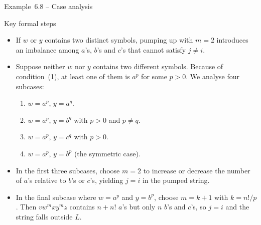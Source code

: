\begin{frame}[t]{Example 6.8 – Case analysis}
  \begin{tblock}{Key formal steps}
    \begin{itemize}
      \item If $w$ or $y$ contains two distinct symbols, pumping up with
        $m=2$ introduces an imbalance among $a$’s, $b$’s and $c$’s that
        cannot satisfy $j \ne i$.
      \item Suppose neither $w$ nor $y$ contains two different symbols.
        Because of condition (1), at least one of them is $a^p$ for
        some $p>0$.  We analyse four subcases:
        \begin{enumerate}
          \item $w=a^p$, $y=a^q$.
          \item $w=a^p$, $y=b^q$ with $p>0$ and $p \ne q$.
          \item $w=a^p$, $y=c^q$ with $p>0$.
          \item $w=a^p$, $y=b^p$ (the symmetric case).
        \end{enumerate}
      \item In the first three subcases, choose $m=2$ to increase or
        decrease the number of $a$’s relative to $b$’s or $c$’s,
        yielding $j = i$ in the pumped string.
      \item In the final subcase where $w=a^p$ and $y=b^p$, choose
        $m = k+1$ with $k = n!/p$.  Then $v w^m x y^m z$ contains
        $n + n!$ $a$’s but only $n$ $b$’s and $c$’s, so $j = i$ and the
        string falls outside $L$.
    \end{itemize}
  \end{tblock}
  \label{fr:6.1-25}
\end{frame}

